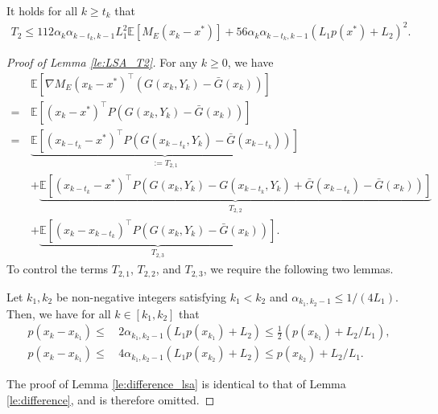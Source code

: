 \documentclass[11 pt]{article}
\begin{document}
	\begin{lemma}\label{le:LSA_T2}
		It holds for all $k\geq t_k$ that
		\begin{align*}
			T_2\leq 112\alpha_k\alpha_{k-t_k,k-1}L_1^2\mathbb{E}[M_E(x_k-x^*)]+56\alpha_k\alpha_{k-t_k,k-1}(L_1p(x^*)+L_2)^2.
		\end{align*}
	\end{lemma}
	\begin{proof}[Proof of Lemma \ref{le:LSA_T2}]
		For any $k\geq 0$, we have
		\begin{align}\label{eq:thm:lsa_proof_T2}
			&\mathbb{E}[\nabla M_E(x_k-x^*)^\top (G(x_k,Y_k)-\bar{G}(x_k))]\nonumber\\
			=\,&\mathbb{E}[(x_k-x^*)^\top P (G(x_k,Y_k)-\bar{G}(x_k))]\nonumber\\
			=\,&\underbrace{\mathbb{E}[(x_{k-t_k}-x^*)^\top P (G(x_{k-t_k},Y_k)-\bar{G}(x_{k-t_k}))]}_{:=T_{2,1}}\nonumber\\
			&+\underbrace{\mathbb{E}[(x_{k-t_k}-x^*)^\top P (G(x_k,Y_k)-G(x_{k-t_k},Y_k)+\bar{G}(x_{k-t_k})-\bar{G}(x_k))]}_{T_{2,2}}\nonumber\\
			&+\underbrace{\mathbb{E}[(x_k-x_{k-t_k})^\top P (G(x_k,Y_k)-\bar{G}(x_k))]}_{T_{2,3}}.
		\end{align}
		To control the terms $T_{2,1}$, $T_{2,2}$, and $T_{2,3}$, we require the following two lemmas.
		
		\begin{lemma}\label{le:difference_lsa}
			Let $k_1,k_2$ be non-negative integers 
			satisfying $k_1<k_2$ and $\alpha_{k_1,k_2-1}\leq 1/(4L_1)$. Then, we have for all $k\in [k_1,k_2]$ that
			\begin{align*}
				p(x_k-x_{k_1})\leq\,& 2\alpha_{k_1,k_2-1}(L_1p(x_{k_1})+L_2)\leq  \frac{1}{2}(p(x_{k_1})+L_2/L_1),\\
				p(x_k-x_{k_1})\leq\,& 4\alpha_{k_1,k_2-1}(L_1p(x_{k_2})+L_2)\leq p(x_{k_2})+L_2/L_1.
			\end{align*}
		\end{lemma}
		The proof of Lemma \ref{le:difference_lsa} is identical to that of Lemma \ref{le:difference}, and is therefore omitted.
		

\end{proof}
\end{document}
